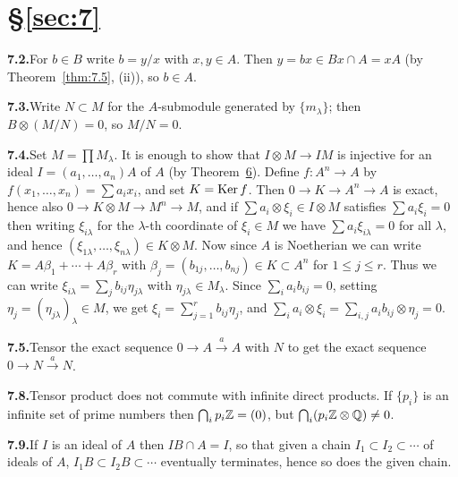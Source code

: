 
\section*{\S\ref{sec:7}}

\noindent\textbf{7.2.}\quad For $b \in B$ write $b = y/x$ with $x, y \in A$. Then $y = bx \in Bx \cap A = xA$
(by Theorem~\ref{thm:7.5}, (ii)), so $b \in A$.

\noindent\textbf{7.3.}\quad Write $N \subset M$ for the $A$-submodule generated by $\{m_\lambda\}$; then $B \otimes
(M/N) = 0$, so $M/N = 0$.

\noindent\textbf{7.4.}\quad Set $M = \prod M_\lambda$. It is enough to show that $I \otimes M \to IM$ is injective
for an ideal $I = (a_1, \ldots, a_n)A$ of $A$ (by Theorem~\hyperref[thm:7.6]{6}). Define $f\colon A^n \to A$ by
$f(x_1, \ldots, x_n) = \sum a_ix_i$, and set $K = \operatorname{Ker} f$. Then $0 \to K \to A^n \to A$ is
exact, hence also $0 \to K \otimes M \to M^n \to M$, and if $\sum a_i \otimes \xi_i \in I \otimes M$ satisfies
$\sum a_i\xi_i = 0$ then writing $\xi_{i\lambda}$ for the $\lambda$-th coordinate of $\xi_i \in M$ we have
$\sum a_i\xi_{i\lambda} = 0$ for all $\lambda$, and hence $(\xi_{1\lambda}, \ldots, \xi_{n\lambda}) \in K \otimes M$.
Now since $A$ is Noetherian we can write $K = A\beta_1 + \cdots + A\beta_r$ with $\beta_j
= (b_{1j}, \ldots, b_{nj}) \in K \subset A^n$ for $1 \le j \le r$. Thus we can write $\xi_{i\lambda} = \sum_j b_{ij}\eta_{j\lambda}$
with $\eta_{j\lambda} \in M_\lambda$. Since $\sum_i a_ib_{ij} = 0$, setting $\eta_j = (\eta_{j\lambda})_\lambda \in M$, we get
$\xi_i = \sum_{j=1}^{r} b_{ij}\eta_j$, and $\sum_i a_i \otimes \xi_i = \sum_{i,j} a_ib_{ij} \otimes \eta_j = 0$.

\noindent\textbf{7.5.}\quad Tensor the exact sequence $0 \to A \xrightarrow{a} A$ with $N$ to get the exact sequence
$0 \to N \xrightarrow{a} N$.

\noindent\textbf{7.8.}\quad Tensor product does not commute with infinite direct products. If $\{p_i\}$ is
an infinite set of prime numbers then $\bigcap_i p_i\mathbb{Z} = (0)$, but $\bigcap_i (p_i\mathbb{Z} \otimes \mathbb{Q}) \neq 0$.

\noindent\textbf{7.9.}\quad If $I$ is an ideal of $A$ then $IB \cap A = I$, so that given a chain $I_1 \subset I_2 \subset \cdots$ of
ideals of $A$, $I_1B \subset I_2B \subset \cdots$ eventually terminates, hence so does the given
chain.

